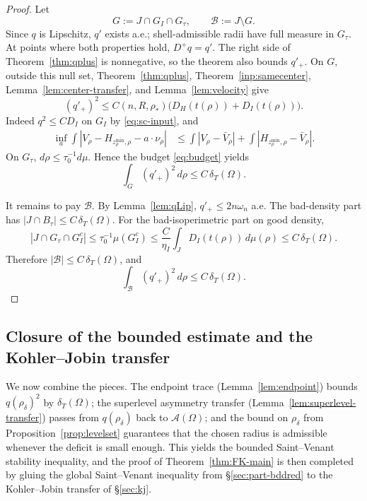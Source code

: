\documentclass[11pt]{amsart}
\theoremstyle{definition}
\newcommand{\Om}{\Omega}
\newcommand{\Fr}{\mathcal A}
\newcommand{\dT}{\delta_T}
\newcommand{\rstar}{\rho_*}
\newcommand{\rdel}{\rho_\delta}
\begin{document}
\begin{proof}
Let
\[
   G:=J\cap G_I\cap G_\tau,\qquad \mathcal B:=J\setminus G .
\]
Since \(q\) is Lipschitz, \(q'\) exists a.e.; shell-admissible radii have
full measure in \(G_\tau\).  At points where both properties hold,
\(D^+q=q'\).  The right side of Theorem~\ref{thm:qplus} is nonnegative,
so the theorem also bounds \(q'_+\).  On \(G\), outside this null set,
Theorem~\ref{thm:qplus}, Theorem~\ref{inp:samecenter},
Lemma~\ref{lem:center-transfer}, and Lemma~\ref{lem:velocity} give
\[
   (q'_+)^2
   \le C(n,R,\rstar)\bigl(D_H(t(\rho))+D_I(t(\rho))\bigr).
\]
Indeed \(q^2\le C D_I\) on \(G_I\) by \eqref{eq:sc-input}, and
\[
\begin{aligned}
   \inf_a\int |V_\rho-H_{z_\rho^{\min},\rho}-a\cdot\nu_\rho|
   &\le
   \int |V_\rho-\bar V_\rho|
   +\int |H_{z_\rho^{\min},\rho}-\bar V_\rho|.
\end{aligned}
\]
On \(G_\tau\), \(d\rho\le\tau_0^{-1}d\mu\).  Hence the budget
\eqref{eq:budget} yields
\[
   \int_G(q'_+)^2\,d\rho\le C\,\dT(\Om).
\]

It remains to pay \(\mathcal B\).  By Lemma~\ref{lem:qLip},
\(q'_+\le2n\omega_n\) a.e.  The bad-density part has
\(|J\cap B_\tau|\le C\,\dT(\Om)\).  For the bad-isoperimetric part on
good density,
\[
   |J\cap G_\tau\cap G_I^c|
   \le \tau_0^{-1}\mu(G_I^c)
   \le \frac{C}{\eta_I}\int_JD_I(t(\rho))\,d\mu(\rho)
   \le C\,\dT(\Om).
\]
Therefore \(|\mathcal B|\le C\,\dT(\Om)\), and
\[
   \int_{\mathcal B}(q'_+)^2\,d\rho\le C\,\dT(\Om).
\]
\end{proof}

\subsection{Closure of the bounded estimate and the Kohler--Jobin transfer}\label{sec:part-putting-together}

We now combine the pieces.  The endpoint trace
(Lemma~\ref{lem:endpoint}) bounds \(q(\rdel)^2\) by \(\dT(\Om)\); the
superlevel asymmetry transfer (Lemma~\ref{lem:superlevel-transfer})
passes from \(q(\rdel)\) back to \(\Fr(\Om)\); and the bound on
\(\rdel\) from Proposition~\ref{prop:levelset} guarantees that the
chosen radius is admissible whenever the deficit is small enough.
This yields the bounded Saint--Venant stability inequality, and the
proof of Theorem~\ref{thm:FK-main} is then completed by gluing the
global Saint--Venant inequality from \S\ref{sec:part-bddred} to the
Kohler--Jobin transfer of \S\ref{sec:kj}.
\end{document}
